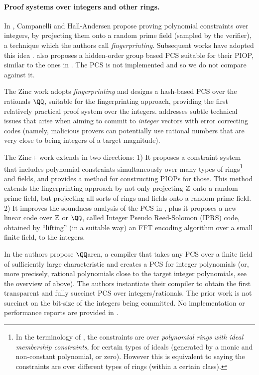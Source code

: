 \paragraph{Proof systems over integers and other rings.} In \cite{zaratan}, Campanelli and Hall-Andersen propose proving polynomial constraints over integers, by projecting them onto a random prime field (sampled by the verifier), a technique which the authors call \emph{fingerprinting}. Subsequent works have adopted this idea \cite{zinc,qaren,zincplus,limber}. \cite{zaratan} also proposes a hidden-order group based PCS suitable for their PIOP, similar to the ones in \cite{DARK,BlockDARK}. The PCS is not implemented and so we do not compare against it.

The Zinc \cite{zinc} work adopts \emph{fingerprinting} and designs a hash-based PCS over the rationals $\QQ$, suitable for the fingerprinting approach, providing the first relatively practical proof system over the integers. \cite{zinc} addresses subtle technical issues that arise when aiming to commit to \emph{integer} vectors with error correcting codes (namely, malicious provers can potentially use rational numbers that are very close to being integers of a target magnitude).

The Zinc+ \cite{zincplus} work extends \cite{zinc} in two directions: 1) It proposes a constraint system that includes polynomial constraints simultaneously over many types of rings\footnote{In the terminology of \cite{zincplus}, the constraints are over \emph{polynomial rings with ideal membership constraints}, for certain types of ideals (generated by a monic and non-constant polynomial, or zero). However this is equivalent to saying the constraints are over different types of rings (within a certain class).} and fields, and provides a method for constructing PIOPs for those. This method extends the fingerprinting approach by not only projecting $\mathbb{Z}$ onto a random prime field, but projecting all sorts of rings and fields onto a random prime field. 2) It improves the soundness analysis of the PCS in \cite{zinc}, plus it proposes a new linear code over $\mathbb{Z}$ or $\QQ$, called Integer Pseudo Reed-Solomon (IPRS) code, obtained by ``lifting'' (in a suitable way) an FFT encoding algorithm over a small finite field, to the integers. 



In \cite{qaren} the authors propose $\QQ$aren, a compiler that takes any PCS over a finite field of sufficiently large characteristic and creates a PCS for integer polynomials (or, more precisely, rational polynomials close to the target integer polynomials, see the overview of \cite{zinc} above). The authors instantiate their compiler to obtain the first transparent and fully succinct PCS over integers/rationals. The prior work \cite{zinc,zincplus} is not succinct on the bit-size of the integers being committed. No implementation or performance reports are provided in \cite{qaren}.

